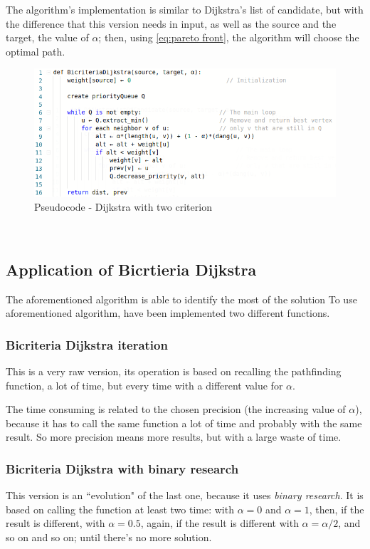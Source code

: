 \documentclass[a4paper,11pt]{report}
\begin{document}
\vspace{5mm}

The algorithm's implementation is similar to Dijkstra's list of candidate, but with the difference that this version needs in input, as well as the source and the target, the value of $\alpha$; then, using \eqref{eq:pareto front}, the algorithm will choose the optimal path.

\begin{figure}[h]
	\centering
	\includegraphics[width=\linewidth]{img/bicriteriaDijkstra.png}
	\caption{Pseudocode - Dijkstra with two criterion}
	\label{fig:bicriteriaDijkstra}
\end{figure}
\
\subsection{Application of Bicrtieria Dijkstra}
The aforementioned algorithm is able to identify the most of the solution 
To use aforementioned algorithm, have been implemented two different functions.

\subsubsection{Bicriteria Dijkstra iteration}
This is a very raw version, its operation is based on recalling the pathfinding function, a lot of time, but every time with a different value for $\alpha$.

The time consuming is related to the chosen precision (the increasing value of $\alpha$), because it has to call the same function a lot of time and probably with the same result. So more precision means more results, but with a large waste of time.

\subsubsection{Bicriteria Dijkstra with binary research}
This version is an ``evolution" of the last one, because it uses \textit{binary research}. It is based on calling the function at least two time: with $\alpha = 0$ and $\alpha=1$, then, if the result is different, with $\alpha=0.5$, again, if the result is different with $\alpha=\alpha/2$, and so on and so on; until there's no more solution.
\end{document}
